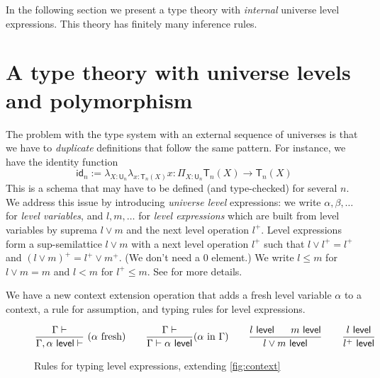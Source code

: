\documentclass[11pt,a4paper]{article}
\theoremstyle{definition}
\newcommand{\Id}{\mathsf{Id}}
\newcommand{\id}{\mathsf{id}}
\newcommand{\NN}{\mathsf{N}}
\newcommand{\UU}{\mathsf{U}}
\newcommand{\Level}{\mathsf{level}}
\newcommand{\mylam}[3]{\lambda_{#1:#2}#3}
\newcommand{\mypi}[3]{\Pi_{#1:#2}#3}
\newcommand{\T}{\mathsf{T}}
\begin{document}


In the following section we present a type theory with \emph{internal}
universe level expressions. This theory has finitely many inference rules.

 \section{A type theory with universe levels and polymorphism }\label{sec:internal}

The problem with the type system with an external sequence of universes
is that we have to \emph{duplicate} definitions that follow
the same pattern. For instance, we have the identity function
$$
\id_n := \mylam{X}{\UU_n}{\mylam{x}{\T_n(X)}{x}} : \mypi{X}{\UU_n}{\T_n(X)\rightarrow \T_n(X)}
$$
This is a schema that
may have to be defined (and type-checked) for several $n$.
We address this issue by introducing \emph{universe level}
expressions: we write $\alpha,\beta,\dots$
for \emph{level variables}, and $l,m,\dots$ for
\emph{level expressions} which are built from level variables
by suprema $l \vee m$ and the next level operation $l^+$.
Level expressions form a sup-semilattice $l\vee m$
with a next level operation $l^+$ such that $l \vee l^+ = l^+$
and $(l\vee m)^+ = l^+\vee m^+$. (We don't need a $0$ element.)
We write $l\leqslant m$ for $l\vee m = m$ and $l<m$ for $l^+\leqslant m$.
See \cite{bezem-coquand:lattices} for more details.


We have a new context extension operation that adds a fresh level variable
$\alpha$ to a context, a rule for assumption, and typing rules
for level expressions.

\begin{figure}[H]
  \caption{Rules for typing level expressions, extending
  \cref{fig:context}}\label{fig:contextL}
$$
\frac{\Gamma\vdash}{\Gamma,\alpha~\Level\vdash}~(\alpha~\text{fresh})~~~~~~
\frac{\Gamma\vdash}{\Gamma\vdash\alpha~\Level}(\alpha~\text{in}~\Gamma)~~~~~~
\frac{l~\Level~~~~~m~\Level}{l\vee m~\Level}~~~~~~
\frac{l~\Level}{l^+~\Level}
\belowdisplayshortskip 0pt
$$
\end{figure}
\end{document}
